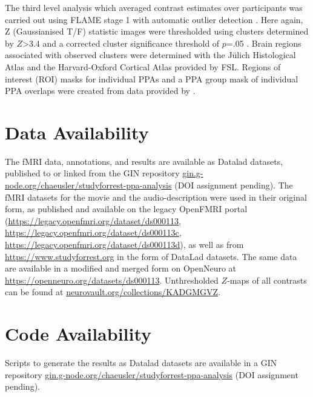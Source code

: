 \documentclass[english,11pt]{article}
\begin{document}
The third level analysis which averaged contrast estimates over participants was
carried out using FLAME stage 1 with automatic outlier detection
\citep{beckmann2003general, woolrich2004multilevel, woolrich2008robust}.
Here again, Z (Gaussianised T/F) statistic images were thresholded using
clusters determined by $Z$>3.4 and a corrected cluster significance threshold of
$p$=.05 \citep{worsley2001statistical}.
Brain regions associated with observed clusters were determined with the Jülich
Histological Atlas \citep{eickhoff2005toolbox, eickhoff2007assignment} and the
Harvard-Oxford Cortical Atlas \citep{desikan2006automated} provided by FSL.
Regions of interest (ROI) masks for individual PPAs and a PPA group mask of
individual PPA overlaps were created from data provided by
\citet{sengupta2016extension}.



\section*{Data Availability}

The fMRI data, annotations, and results are available as Datalad \citep{datalad} datasets,
published to or linked from the
GIN repository \href{https://gin.g-node.org/chaeusler/studyforrest-ppa-analysis}{\url{gin.g-node.org/chaeusler/studyforrest-ppa-analysis}} (DOI assignment pending).
The fMRI datasets for the movie and the audio-description were used in their original form, as published and available on the legacy OpenFMRI portal (\url{https://legacy.openfmri.org/dataset/ds000113}, \url{https://legacy.openfmri.org/dataset/ds000113c}, \url{https://legacy.openfmri.org/dataset/ds000113d}), as well as from \url{https://www.studyforrest.org} in the form of DataLad datasets.
The same data are available in a modified and merged form on OpenNeuro at \url{https://openneuro.org/datasets/ds000113}.
Unthresholded $Z$-maps of all contrasts can be found at
\href{https://neurovault.org/collections/KADGMGVZ/}{\url{neurovault.org/collections/KADGMGVZ}}.


\section*{Code Availability}

Scripts to generate the results as Datalad \citep{datalad} datasets are available in a
GIN repository \href{https://gin.g-node.org/chaeusler/studyforrest-ppa-analysis}{\url{gin.g-node.org/chaeusler/studyforrest-ppa-analysis}} (DOI assignment pending).
\end{document}
